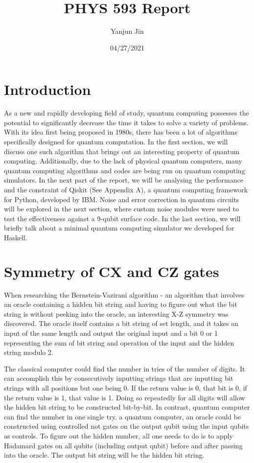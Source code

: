 \documentclass{article}
\title{PHYS 593 Report}
\author{Yanjun Jin}
\date{04/27/2021}
\begin{document}
\maketitle

\section{Introduction}
As a new and rapidly developing field of study, quantum computing possesses the potential to significantly decrease the time it takes to solve a variety of problems. With its idea first being proposed in 1980s, there has been a lot of algorithms specifically designed for quantum computation. In the first section, we will discuss one such algorithm that brings out an interesting property of quantum computing. Additionally, due to the lack of physical quantum computers, many quantum computing algorithms and codes are being run on quantum computing simulators. In the next part of the report, we will be analysing the performance and the constraint of Qiskit (See Appendix A), a quantum computing framework for Python, developed by IBM. Noise and error correction in quantum circuits will be explored in the next section, where custom noise modules were used to test the effectiveness against a 9-qubit surface code. In the last section, we will briefly talk about a minimal quantum computing simulator we developed for Haskell.

\section{Symmetry of CX and CZ gates}

When researching the Bernstein-Vazirani algorithm - an algorithm that involves an oracle containing a hidden bit string and having to figure out what the bit string is without peeking into the oracle, an interesting X-Z symmetry was discovered. The oracle itself contains a bit string of set length, and it takes an input of the same length and output the original input and a bit 0 or 1 representing the sum of bit string and operation of the input and the hidden string modulo 2. 

The classical computer could find the number in tries of the number of digits. It can accomplish this by consecutively inputting strings that are inputting bit strings with all positions but one being 0. If the return value is 0, that bit is 0, if the return value is 1, that value is 1. Doing so repeatedly for all digits will allow the hidden bit string to be constructed bit-by-bit. In contrast, quantum computer can find the number in one single try. a quantum computer, an oracle could be constructed using controlled not gates on the output qubit using the input qubits as controls. To figure out the hidden number, all one needs to do is to apply Hadamard gates on all qubits (including output qubit) before and after passing into the oracle. The output bit string will be the hidden bit string.
\end{document}
